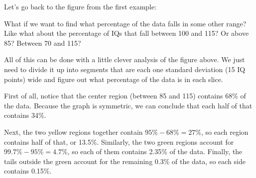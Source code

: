 Let's go back to the figure from the first example:
\begin{center}
\end{center}

What if we want to find what percentage of the data falls in some other range?  Like what about the percentage of IQs that fall between 100 and 115?  Or above 85?  Between 70 and 115?

All of this can be done with a little clever analysis of the figure above.  We just need to divide it up into segments that are each one standard deviation (15 IQ points) wide and figure out what percentage of the data is in each slice.

First of all, notice that the center region (between 85 and 115) contains 68\% of the data.  Because the graph is symmetric, we can conclude that each half of that contains 34\%.

Next, the two yellow regions together contain $95\%-68\% = 27\%$, so each region contains half of that, or 13.5\%.  Similarly, the two green regions account for $99.7\%-95\% = 4.7\%$, so each of them contains 2.35\% of the data.  Finally, the tails outside the green account for the remaining 0.3\% of the data, so each side contains 0.15\%.

